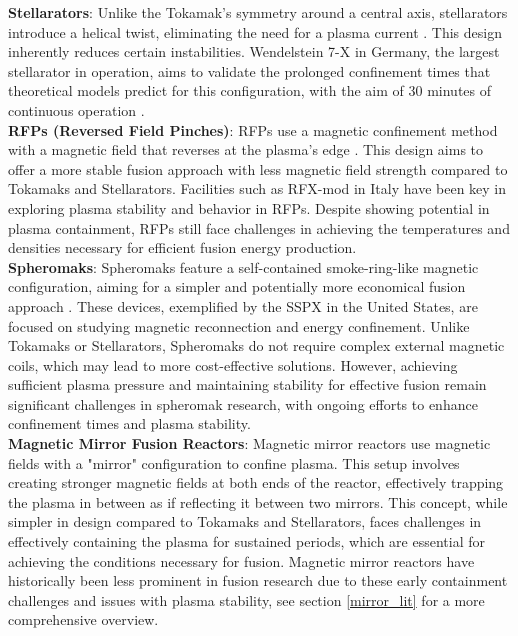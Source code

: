 \textbf{Stellarators}: Unlike the Tokamak's symmetry around a central axis, stellarators introduce a helical twist, eliminating the need for a plasma current \cite{spitzer1958stellarator}. This design inherently reduces certain instabilities. Wendelstein 7-X in Germany, the largest stellarator in operation, aims to validate the prolonged confinement times that theoretical models predict for this configuration, with the aim of 30 minutes of continuous operation \cite{klinger2019overview}.\\

\textbf{RFPs (Reversed Field Pinches)}: RFPs use a magnetic confinement method with a magnetic field that reverses at the plasma's edge \cite{bodin1980reversed}. This design aims to offer a more stable fusion approach with less magnetic field strength compared to Tokamaks and Stellarators. Facilities such as RFX-mod in Italy have been key in exploring plasma stability and behavior in RFPs. Despite showing potential in plasma containment, RFPs still face challenges in achieving the temperatures and densities necessary for efficient fusion energy production.\\

\textbf{Spheromaks}: Spheromaks feature a self-contained smoke-ring-like magnetic configuration, aiming for a simpler and potentially more economical fusion approach \cite{jarboe1994review}. These devices, exemplified by the SSPX in the United States, are focused on studying magnetic reconnection and energy confinement. Unlike Tokamaks or Stellarators, Spheromaks do not require complex external magnetic coils, which may lead to more cost-effective solutions. However, achieving sufficient plasma pressure and maintaining stability for effective fusion remain significant challenges in spheromak research, with ongoing efforts to enhance confinement times and plasma stability.\\

\textbf{Magnetic Mirror Fusion Reactors}: Magnetic mirror reactors use magnetic fields with a "mirror" configuration to confine plasma. This setup involves creating stronger magnetic fields at both ends of the reactor, effectively trapping the plasma in between as if reflecting it between two mirrors. This concept, while simpler in design compared to Tokamaks and Stellarators, faces challenges in effectively containing the plasma for sustained periods, which are essential for achieving the conditions necessary for fusion. Magnetic mirror reactors have historically been less prominent in fusion research due to these early containment challenges and issues with plasma stability, see section \ref{mirror_lit} for a more comprehensive overview.\\


